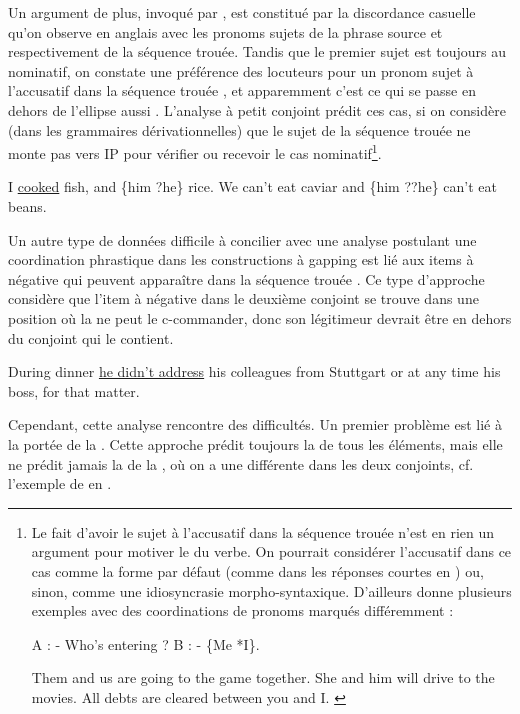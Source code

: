 Un argument de plus, invoqué par \citet{Siegel1987}, est constitué par la discordance casuelle qu’on observe en anglais avec les pronoms sujets de la phrase source et respectivement de la séquence trouée. Tandis que le premier sujet est toujours au nominatif, on constate une préférence des locuteurs pour un pronom sujet à l’accusatif dans la séquence trouée , et apparemment c’est ce qui se passe en dehors de l’ellipse aussi . L’analyse à petit conjoint prédit ces cas, si on considère (dans les grammaires dérivationnelles) que le sujet de la séquence trouée ne monte pas vers IP pour vérifier ou recevoir le cas nominatif\footnote{
 Le fait d’avoir le sujet à l’accusatif dans la séquence trouée n’est en rien un argument pour motiver le  du verbe. On pourrait considérer l’accusatif dans ce cas comme la forme par défaut (comme dans les réponses courtes en ) ou, sinon, comme une idiosyncrasie morpho-syntaxique. D’ailleurs \citet{Kim2006} donne plusieurs exemples  avec des coordinations de pronoms marqués différemment :
 
 \ea \label{ch2:foot58i}
 A : - Who’s entering ? B : - \{Me {\textbar} *I\}.
 \z

\ea \label{ch2:foot58ii}
\ea Them and us are going to the game together.
\ex She and him will drive to the movies.
\ex All debts are cleared between you and I. \citep[603]{Kim2006}  
\z
\z
}.


\ea 
\ea I \uline{cooked} fish, and \{him {\textbar} ?he\} rice. \citep{ZoernerEtAl2000} \label{ch2:ex193a} 
\ex We can’t eat caviar and \{him {\textbar} ??he\} can’t eat beans. \citep[184]{Winkler2005} \label{ch2:ex193b}
\z
\z

Un autre type de données difficile à concilier avec une analyse postulant une coordination phrastique dans les constructions à gapping est lié aux items à  négative qui peuvent apparaître dans la séquence trouée . Ce type d’approche considère que l’item à  négative dans le deuxième conjoint se trouve dans une position où la  ne peut le c-commander, donc son légitimeur devrait être en dehors du conjoint qui le contient.  

\ea \label{ch2:ex194}
During dinner \uline{he didn’t address} his colleagues from Stuttgart or at any time his boss, for that matter. \citep[186]{Winkler2005} 
\z

Cependant, cette analyse rencontre des difficultés. Un premier problème est lié à la portée de la  \citep{Repp2009,Toosarvandani2011}. Cette approche prédit toujours la  de tous les éléments, mais elle ne prédit jamais la  de la , où on a une  différente dans les deux conjoints, cf. l’exemple de \citet[2]{Repp2009} en .

